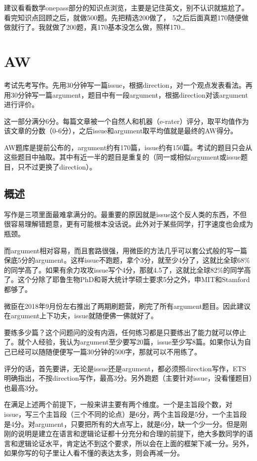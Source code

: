 \documentclass[11pt,a4paper]{article}
\begin{document}
{{			建议看看数学onepass部分的知识点浏览，主要是记住英文，别不认识就尴尬了。看完知识点回顾之后，就做500题。先把精选200做了，
			5之后后面真题170随便做做就行了。我就做了200题，真170基本没怎么做，照样170…	
	}
	\newpage
	\section{\bfseries\LARGE{AW}}{
		考试先考写作。先用30分钟写一篇issue，根据direction，对一个观点发表看法。再用30分钟写一篇argument，题目中有一段argument，根据direction对该argument进行评价。
		
		这一部分满分6分。每篇文章被一个自然人和机器（e-rater）评分，取平均值作为该文章的分数（0-6分），之后issue和argument取平均值就是最终的AW得分。
		
		AW题库是提前公布的，argument约有170篇，issue约有150篇。考试的题目只会从这些题目中抽取。其中有近一半的题目是重复的（同一或相似argument或issue题目，只不过更换了direction）。
		
		\subsection*{概述}
		写作是三项里面最难拿满分的。最重要的原因就是issue这个反人类的东西，不但很容易理解错题意，更有可能根本没话说。此外对于某些同学，打字速度也会成为瓶颈。
		
		而argument相对容易，而且套路很强，用微臣的方法几乎可以套公式般的写一篇保底5分的argument。这样issue不跑题，拿个3分，就至少4分了，这就比全球68\%的同学高了。如果有余力攻攻issue写个4分，那就4.5了，这就比全球82\%的同学高了。这个分除了耶鲁生物PhD和哥大统计学硕士要求5分之外，申MIT和Stamford都够了。
		
		微臣在2018年9月份左右推出了两期刷题营，刷完了所有argument题目。因此建议在argument上下功夫，issue就随便佛一佛就好了。
		
		要练多少篇？这个问题问的没有内涵，任何练习都是只要练出了能力就可以停止了。就个人经验，我认为argument至少要写20篇，issue至少写8篇。如果你认为自己已经可以随随便便写一篇30分钟的500字，那就可以不用练了。
		
		评分的话，首先要讲，无论是issue还是argument，都必须照direction写作，ETS明确指出，不按direction写作，最高3分。另外跑题（主要针对issue，没看懂题目）也最高3分。
		
		在满足上述两个前提下，一般来讲主要有两个维度。一个是主旨段个数，对issue，写三个主旨段（三个不同的论点）是6分，两个主旨段是5分，一个主旨段是4分。对argument，只要把所有的大点写上，就是6分，缺一个少一分。但是刚刚的说明是建立在语言和逻辑论证都十分充分和合理的前提下，绝大多数同学的语言和逻辑论证水平，肯定达不到这个要求，所以会在上面的框架下减一分。另外，如果你写的句子里让人看不懂的表达太多，则会再减一分。
		
}}
\end{document}
